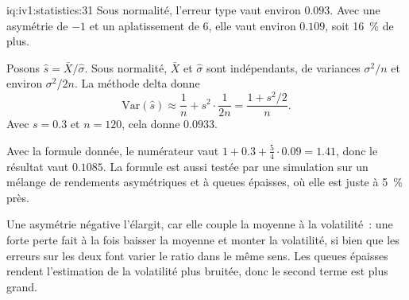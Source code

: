 \begin{solution}{iq:iv1:statistics:31}
Sous normalité, l'erreur type vaut environ $0.093$. Avec une asymétrie de $-1$ et un aplatissement de 6, elle vaut environ $0.109$, soit 16~\% de plus.

Posons $\hat{s} = \bar{X}/\hat\sigma$. Sous normalité, $\bar{X}$ et $\hat\sigma$ sont indépendants, de variances $\sigma^2/n$ et environ $\sigma^2/2n$. La méthode delta donne
\[
\mathrm{Var}(\hat{s}) \approx \frac{1}{n} + s^2 \cdot \frac{1}{2n} = \frac{1 + s^2/2}{n}.
\]
Avec $s = 0.3$ et $n = 120$, cela donne $0.0933$.

Avec la formule donnée, le numérateur vaut $1 + 0.3 + \frac54 \cdot 0.09 = 1.41$, donc le résultat vaut $0.1085$. La formule est aussi testée par une simulation sur un mélange de rendements asymétriques et à queues épaisses, où elle est juste à 5~\% près.

Une asymétrie négative l'élargit, car elle couple la moyenne à la volatilité~: une forte perte fait à la fois baisser la moyenne et monter la volatilité, si bien que les erreurs sur les deux font varier le ratio dans le même sens. Les queues épaisses rendent l'estimation de la volatilité plus bruitée, donc le second terme est plus grand.

\end{solution}

